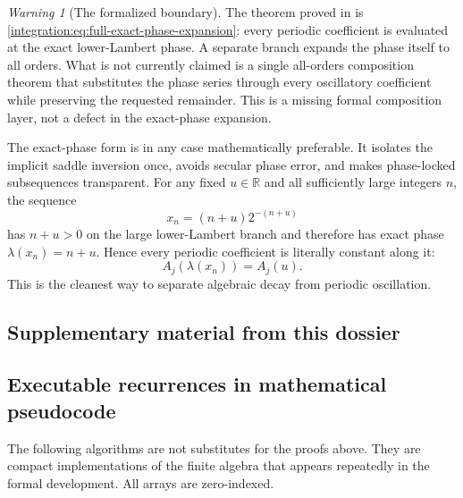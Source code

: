 \documentclass[11pt,oneside]{article}
\theoremstyle{definition}
\theoremstyle{remark}
\newtheorem{warning}[theorem]{Warning}
\newcommand{\R}{\mathbb R}
\begin{document}
\begin{warning}[The formalized boundary]
The theorem proved in  is
\eqref{integration:eq:full-exact-phase-expansion}: every periodic coefficient is evaluated at the exact
lower-Lambert phase.  A separate branch expands the phase itself to all orders.  What is not
currently claimed is a single all-orders composition theorem that substitutes the phase
series through every oscillatory coefficient while preserving the requested remainder.
This is a missing formal composition layer, not a defect in the exact-phase expansion.
\end{warning}

The exact-phase form is in any case mathematically preferable.  It isolates the implicit
saddle inversion once, avoids secular phase error, and makes phase-locked subsequences
transparent.  For any fixed $u\in\R$ and all sufficiently large integers \(n\), the sequence
\begin{equation}
 x_n=(n+u)2^{-(n+u)}
 \label{integration:eq:phase-locked-sequence-supp}
\end{equation}
has \(n+u>0\) on the large lower-Lambert branch and therefore has exact phase
$\lambda(x_n)=n+u$.  Hence every periodic coefficient is literally constant
along it:
\begin{equation}
 A_j(\lambda(x_n))=A_j(u).
 \label{integration:eq:phase-locked-coefficients}
\end{equation}
This is the cleanest way to separate algebraic decay from periodic oscillation.

\clearpage
\subsection*{Supplementary material from this dossier}
\subsection{Executable recurrences in mathematical pseudocode}
\label{integration:app:algorithms}

The following algorithms are not substitutes for the proofs above.  They are compact
implementations of the finite algebra that appears repeatedly in the formal development.
All arrays are zero-indexed.
\end{document}
